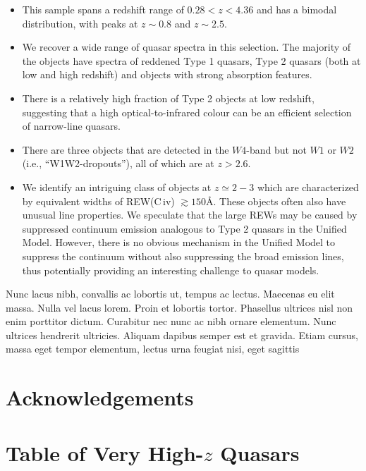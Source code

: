 \documentclass[usenatbib]{mnras}
\begin{document}
\begin{itemize}
    \item{This sample spans a redshift range of $0.28 < z < 4.36$ and has a bimodal distribution, with peaks 
        at $z\sim0.8$ and $z\sim2.5$.}
   \item{We recover a wide range of quasar spectra in this selection.  
        The majority of the objects have spectra of reddened Type 1
        quasars, Type 2 quasars (both at low and high redshift) and objects
        with strong absorption features.} 
    \item{There is a relatively high fraction of Type 2 objects at low redshift,
        suggesting that a high optical-to-infrared colour can be an efficient
        selection of narrow-line quasars.}
    \item{There are three objects that are detected in the $W4$-band but
        not $W1$ or $W2$ (i.e., ``W1W2-dropouts''), all of which are at
        $z>2.6$.}
    \item{We identify an intriguing class of objects at $z\simeq 2-3$ which are
        characterized by equivalent widths of REW(C\,{\sc iv})
        $\gtrsim150$\AA.  These objects often also have unusual line
        properties.  We speculate that the large REWs may be caused by
        suppressed continuum emission analogous to Type 2 quasars in the
        Unified Model. However, there is no obvious mechanism in the Unified
        Model to suppress the continuum without also suppressing the broad
        emission lines, thus potentially providing an interesting challenge to
        quasar models.} 
\end{itemize}
Nunc lacus nibh, convallis ac lobortis ut, tempus ac lectus. Maecenas
eu elit massa. Nulla vel lacus lorem. Proin et lobortis
tortor. Phasellus ultrices nisl non enim porttitor dictum. Curabitur
nec nunc ac nibh ornare elementum. Nunc ultrices hendrerit
ultricies. Aliquam dapibus semper est et gravida. Etiam cursus, massa
eget tempor elementum, lectus urna feugiat nisi, eget sagittis


\section*{Acknowledgements}




\appendix

\section{Table of Very High-$z$ Quasars}









%


\end{document}
